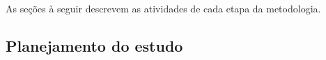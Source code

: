 \documentclass[12pt]{article}
\begin{document}
%  
%  
%  


As seções à seguir descrevem as atividades de cada etapa da metodologia.

\subsection{Planejamento do estudo}
\end{document}

